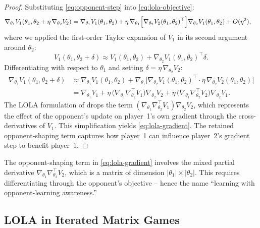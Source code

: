 \documentclass[11pt,a4paper]{article}
\begin{document}
\begin{proof}
Substituting \eqref{eq:opponent-step} into \eqref{eq:lola-objective}:
\begin{align*}
  \nabla_{\theta_1}
  V_1(\theta_1, \theta_2 + \eta\, \nabla_{\theta_2} V_2)
  &= \nabla_{\theta_1} V_1(\theta_1, \theta_2)
    + \eta\, \nabla_{\theta_1} \Bigl[
      \nabla_{\theta_2} V_2(\theta_1, \theta_2)^\top
    \Bigr]
    \nabla_{\theta_2} V_1(\theta_1, \theta_2)
    + O(\eta^2),
\end{align*}
where we applied the first-order Taylor expansion of $V_1$ in its second
argument around $\theta_2$:
\[
  V_1(\theta_1, \theta_2 + \delta)
  \approx V_1(\theta_1, \theta_2)
  + \nabla_{\theta_2} V_1(\theta_1, \theta_2)^\top \delta.
\]
Differentiating with respect to $\theta_1$ and setting
$\delta = \eta\, \nabla_{\theta_2} V_2$:
\begin{align*}
  \nabla_{\theta_1} V_1(\theta_1, \theta_2 + \delta)
  &\approx \nabla_{\theta_1} V_1(\theta_1, \theta_2)
  + \nabla_{\theta_1}\bigl[
    \nabla_{\theta_2} V_1(\theta_1, \theta_2)^\top \cdot
    \eta\, \nabla_{\theta_2} V_2(\theta_1, \theta_2)
  \bigr] \\
  &= \nabla_{\theta_1} V_1
  + \eta\, \bigl(\nabla_{\theta_1} \nabla_{\theta_2}^\top V_1\bigr)
    \nabla_{\theta_2} V_2
  + \eta\, \bigl(\nabla_{\theta_1} \nabla_{\theta_2}^\top V_2\bigr)
    \nabla_{\theta_2} V_1.
\end{align*}
The LOLA formulation of \citet{foerster2018lola} drops the term
$(\nabla_{\theta_1} \nabla_{\theta_2}^\top V_1) \nabla_{\theta_2} V_2$,
which represents the effect of the opponent's update on player~1's own
gradient through the cross-derivatives of $V_1$.  This simplification
yields \eqref{eq:lola-gradient}.  The retained opponent-shaping term
captures how player~1 can influence player~2's gradient step to
benefit player~1.
\end{proof}

\begin{remark}
The opponent-shaping term in \eqref{eq:lola-gradient} involves the
mixed partial derivative $\nabla_{\theta_1} \nabla_{\theta_2}^\top V_2$,
which is a matrix of dimension $|\theta_1| \times |\theta_2|$.  This
requires differentiating through the opponent's objective -- hence the
name ``learning with opponent-learning awareness.''
\end{remark}

\subsection{LOLA in Iterated Matrix Games}
\end{document}
